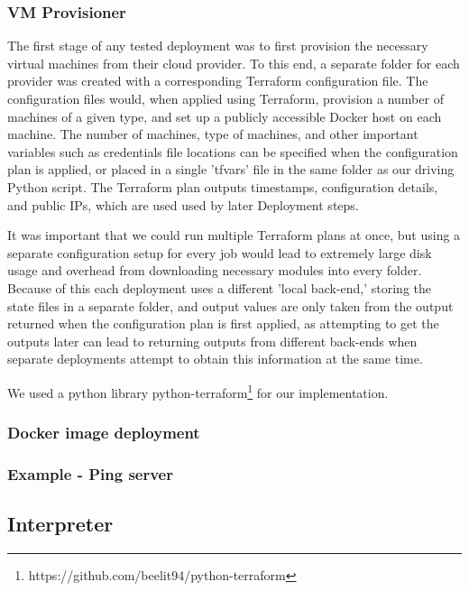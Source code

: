 \documentclass{article}
\begin{document}
\subsubsection{VM Provisioner}
The first stage of any tested deployment was to first provision the necessary virtual machines from their cloud provider. To this end, a separate folder for each provider was created with a corresponding Terraform configuration file. The configuration files would, when applied using Terraform, provision a number of machines of a given type, and set up a publicly accessible Docker host on each machine. The number of machines, type of machines, and other important variables such as credentials file locations can be specified when the configuration plan is applied, or placed in a single 'tfvars' file in the same folder as our driving Python script. The Terraform plan outputs timestamps, configuration details, and public IPs, which are used used by later Deployment steps.

It was important that we could run multiple Terraform plans at once, but using a separate configuration setup for every job would lead to extremely large disk usage and overhead from downloading necessary modules into every folder. Because of this each deployment uses a different 'local back-end,' storing the state files in a separate folder, and output values are only taken from the output returned when the configuration plan is first applied, as attempting to get the outputs later can lead to returning outputs from different back-ends when separate deployments attempt to obtain this information at the same time.

We used a python library python-terraform\footnote{https://github.com/beelit94/python-terraform} for our implementation.
\subsubsection{Docker image deployment}



\subsubsection{Example - Ping server}


\subsection{Interpreter}
\end{document}
